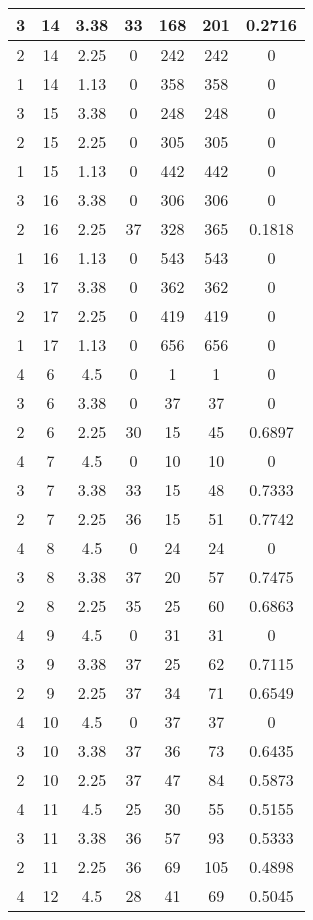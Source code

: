 \documentclass[letterpaper, 12pt]{article}
\begin{document}
\begin{longtable}{|c|c|c|c|c|c|c|}
\hline
3 & 14 & 3.38 & 33 & 168 & 201 & 0.2716 \\
\hline
2 & 14 & 2.25 & 0 & 242 & 242 & 0 \\
\hline
1 & 14 & 1.13 & 0 & 358 & 358 & 0 \\
\hline
3 & 15 & 3.38 & 0 & 248 & 248 & 0 \\
\hline
2 & 15 & 2.25 & 0 & 305 & 305 & 0 \\
\hline
1 & 15 & 1.13 & 0 & 442 & 442 & 0 \\
\hline
3 & 16 & 3.38 & 0 & 306 & 306 & 0 \\
\hline
2 & 16 & 2.25 & 37 & 328 & 365 & 0.1818 \\
\hline
1 & 16 & 1.13 & 0 & 543 & 543 & 0 \\
\hline
3 & 17 & 3.38 & 0 & 362 & 362 & 0 \\
\hline
2 & 17 & 2.25 & 0 & 419 & 419 & 0 \\
\hline
1 & 17 & 1.13 & 0 & 656 & 656 & 0 \\
\hline
4 & 6 & 4.5 & 0 & 1 & 1 & 0 \\
\hline
3 & 6 & 3.38 & 0 & 37 & 37 & 0 \\
\hline
2 & 6 & 2.25 & 30 & 15 & 45 & 0.6897 \\
\hline
4 & 7 & 4.5 & 0 & 10 & 10 & 0 \\
\hline
3 & 7 & 3.38 & 33 & 15 & 48 & 0.7333 \\
\hline
2 & 7 & 2.25 & 36 & 15 & 51 & 0.7742 \\
\hline
4 & 8 & 4.5 & 0 & 24 & 24 & 0 \\
\hline
3 & 8 & 3.38 & 37 & 20 & 57 & 0.7475 \\
\hline
2 & 8 & 2.25 & 35 & 25 & 60 & 0.6863 \\
\hline
4 & 9 & 4.5 & 0 & 31 & 31 & 0 \\
\hline
3 & 9 & 3.38 & 37 & 25 & 62 & 0.7115 \\
\hline
2 & 9 & 2.25 & 37 & 34 & 71 & 0.6549 \\
\hline
4 & 10 & 4.5 & 0 & 37 & 37 & 0 \\
\hline
3 & 10 & 3.38 & 37 & 36 & 73 & 0.6435 \\
\hline
2 & 10 & 2.25 & 37 & 47 & 84 & 0.5873 \\
\hline
4 & 11 & 4.5 & 25 & 30 & 55 & 0.5155 \\
\hline
3 & 11 & 3.38 & 36 & 57 & 93 & 0.5333 \\
\hline
2 & 11 & 2.25 & 36 & 69 & 105 & 0.4898 \\
\hline
4 & 12 & 4.5 & 28 & 41 & 69 & 0.5045 \\

\end{longtable}
\end{document}
